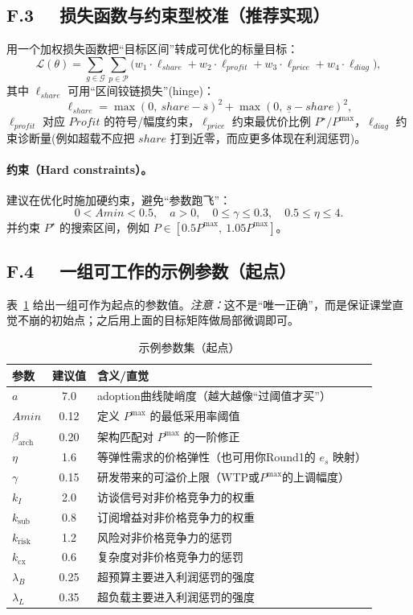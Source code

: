 \documentclass[UTF8,12pt]{ctexart}
\begin{document}
\subsection*{F.3 \ \ 损失函数与约束型校准（推荐实现）}
用一个加权损失函数把“目标区间”转成可优化的标量目标：
\[
\mathcal{L}(\theta)=\sum_{g\in\mathcal{G}}\sum_{p\in\mathcal{P}} 
\Big(
w_1\cdot \ell_{share}+w_2\cdot \ell_{profit}+w_3\cdot \ell_{price}+w_4\cdot \ell_{diag}
\Big),
\]
其中 $\ell_{share}$ 可用“区间铰链损失”(hinge)：
\[
\ell_{share}=
\max(0,\ share-\overline{s})^2+\max(0,\ \underline{s}-share)^2,
\]
$\ell_{profit}$ 对应 $Profit$ 的符号/幅度约束，$\ell_{price}$ 约束最优价比例 $P^\star/P^{\max}$，$\ell_{diag}$ 约束诊断量(例如超载不应把 $share$ 打到近零，而应更多体现在利润惩罚)。

\paragraph{约束（Hard constraints）。}
建议在优化时施加硬约束，避免“参数跑飞”：
\[
0<Amin<0.5,\quad a>0,\quad 0\le \gamma \le 0.3,\quad 0.5\le \eta \le 4.
\]
并约束 $P^\star$ 的搜索区间，例如 $P\in[0.5P^{\max},\ 1.05P^{\max}]$。

\subsection*{F.4 \ \ 一组可工作的示例参数（起点）}
表~\ref{tab:theta} 给出一组可作为起点的参数值。\emph{注意：}这不是“唯一正确”，而是保证课堂直觉不崩的初始点；之后用上面的目标矩阵做局部微调即可。

\begin{table}[h]
\centering
\caption{示例参数集（起点）}\label{tab:theta}
\begin{tabular}{lcl}
\toprule
参数 & 建议值 & 含义/直觉\\
\midrule
$a$ & 7.0 & adoption曲线陡峭度（越大越像“过阈值才买”）\\
$Amin$ & 0.12 & 定义 $P^{\max}$ 的最低采用率阈值\\
$\beta_{\text{arch}}$ & 0.20 & 架构匹配对 $P^{\max}$ 的一阶修正\\
$\eta$ & 1.6 & 等弹性需求的价格弹性（也可用你Round1的 $e_s$ 映射）\\
$\gamma$ & 0.15 & 研发带来的可溢价上限（WTP或$P^{\max}$的上调幅度）\\
$k_I$ & 2.0 & 访谈信号对非价格竞争力的权重\\
$k_{\text{sub}}$ & 0.8 & 订阅增益对非价格竞争力的权重\\
$k_{\text{risk}}$ & 1.2 & 风险对非价格竞争力的惩罚\\
$k_{\text{cx}}$ & 0.6 & 复杂度对非价格竞争力的惩罚\\
$\lambda_B$ & 0.25 & 超预算主要进入利润惩罚的强度\\
$\lambda_L$ & 0.35 & 超负载主要进入利润惩罚的强度\\
\bottomrule
\end{tabular}
\end{table}
\end{document}
